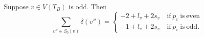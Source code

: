 \begin{lemma}\label{odd0}
Suppose $v \in V(T_B)$ is odd. Then
 \[ \sum_{v'' \in S_0(v)} \delta(v'') = \left\{ \begin{array}{ll}
-2+l_v+2s_v \ &\mathrm{if}\ p_v\ \mathrm{is}\ \mathrm{even} \\                                                                                                                                                                                                                          
-1+l_v+2s_v \ &\mathrm{if}\ p_v\ \mathrm{is}\ \mathrm{odd}.                                                                                                                                                                                                                        \end{array}
 \right. \] 
\end{lemma}
